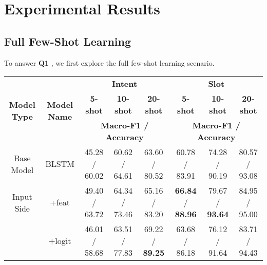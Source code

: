 \section{Experimental Results}
\label{sec:experiments}

\subsection{Full Few-Shot Learning}
To answer \textbf{Q1} , we first explore the full few-shot learning scenario.

\begin{table*}
\setlength{\tabcolsep}{0.23em}
\centering
\small{
\begin{tabular}{|c|c|c|c|c|c|c|c|}

\hline
\multirow{3}{*}{\textbf{Model Type}} & \multirow{3}{*}{\textbf{Model Name}}  & \multicolumn{3}{|c|}{\textbf{Intent}} & \multicolumn{3}{|c|}{\textbf{Slot}} \\
\cline{3-8}
&  & \multicolumn{1}{|c|}{\textbf{5-shot}} & \multicolumn{1}{|c|}{\textbf{10-shot}} & \multicolumn{1}{|c|}{\textbf{20-shot}}
& \multicolumn{1}{|c|}{\textbf{5-shot}} & \multicolumn{1}{|c|}{\textbf{10-shot}} & \multicolumn{1}{|c|}{\textbf{20-shot}}  \\
\cline{3-8}
&  & \multicolumn{3}{|c|}{\textbf{Macro-F1 / Accuracy}} & \multicolumn{3}{|c|}{\textbf{Macro-F1 / Accuracy}} \\
\hline

\rowcolor{Gray}Base Model & BLSTM & 45.28 / 60.02 & 60.62 / 64.61 & 63.60 / 80.52
& 60.78 / 83.91 & 74.28  / 90.19 & 80.57 / 93.08  \\
\hline
Input Side & +feat & 49.40 / 63.72 & 64.34 / 73.46 & 65.16 / 83.20
& \textbf{66.84} / \textbf{88.96} & 79.67 / \textbf{93.64} & 84.95 / 95.00  \\
\hline

\rowcolor{Gray}  & +logit & 46.01 / 58.68 & 63.51 / 77.83 & 69.22 / \textbf{89.25}
& 63.68 / 86.18 & 76.12 / 91.64  & 83.71 / 94.43 \\
\cline{2-8}


\end{tabular}}
\end{table*}
